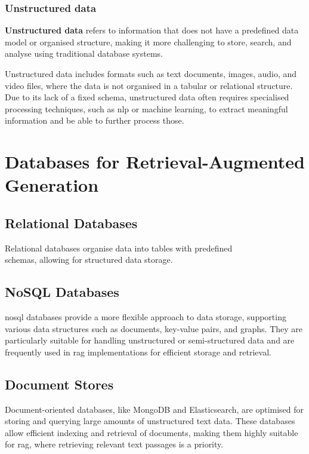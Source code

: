 \subsubsection{Unstructured data}\label{sec:unstructured-data}
\begin{definition}\label{def:unstructured-data}
    \textbf{Unstructured data} refers to information that does not have a predefined data model or organised structure, making it more challenging to store, search, and analyse using traditional database systems.
\end{definition}
Unstructured data includes formats such as text documents, images, audio, and video files, where the data is not organised in a tabular or relational structure. 
Due to its lack of a fixed schema, unstructured data often requires specialised processing techniques, such as \ac{nlp} or machine learning, to extract meaningful information and be able to further process those.
\section{Databases for Retrieval-Augmented Generation}\label{sec:databases-rag}

\subsection{Relational Databases}\label{sec:relational-databases}
Relational databases organise data into tables with predefined\\ schemas, allowing for structured data storage. 

\subsection{NoSQL Databases}\label{sec:nosql-databases}
\ac{nosql} databases provide a more flexible approach to data storage, supporting various data structures such as documents, key-value pairs, and graphs. 
They are particularly suitable for handling unstructured or semi-structured data and are frequently used in \ac{rag} implementations for efficient storage and retrieval.

\subsection{Document Stores}\label{sec:document-stores}
Document-oriented databases, like MongoDB and Elasticsearch, are optimised for storing and querying large amounts of unstructured text data. 
These databases allow efficient indexing and retrieval of documents, making them highly suitable for \ac{rag}, where retrieving relevant text passages is a priority.
